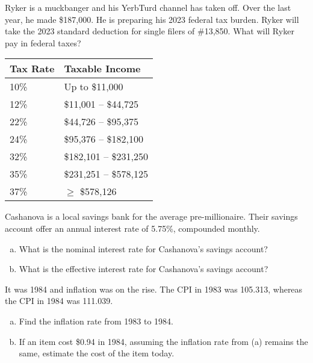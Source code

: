 \documentclass[12pt,letterpaper]{exam}
\begin{document}
\examtitle
{} 
\scores
\bottomline
\newpage

\begin{questions}

\newpage
\question[10] Ryker is a muckbanger and his YerbTurd channel has taken off. Over the last year, he made \$187,000. He is preparing his 2023 federal tax burden. Ryker will take the 2023 standard deduction for single filers of \#13,850. What will Ryker pay in federal taxes? 
	\begin{table}[H]
	\centering
	\begin{tabular}{|l|l|} \hline
	Tax Rate & Taxable Income \\ \hline \hline
	10\% & Up to \$11,000 \\ \hline
	12\% & \$11,001 -- \$44,725 \\ \hline
	22\% & \$44,726 -- \$95,375 \\ \hline
	24\% & \$95,376 -- \$182,100 \\ \hline
	32\% & \$182,101 -- \$231,250 \\ \hline
	35\% & \$231,251 -- \$578,125 \\ \hline
	37\% & $\geq$ \$578,126 \\ \hline
	\end{tabular}
	\end{table}



\newpage
\question[10] Cashanova is a local savings bank for the average pre-millionaire. Their savings account offer an annual interest rate of 5.75\%, compounded monthly. 
	\begin{enumerate}[(a)]
	\item What is the nominal interest rate for Cashanova's savings account?
	\item What is the effective interest rate for Cashanova's savings account?
	\end{enumerate}



\newpage
\question[10] It was 1984 and inflation was on the rise. The CPI in 1983 was 105.313, whereas the CPI in 1984 was 111.039. 
	\begin{enumerate}[(a)]
	\item Find the inflation rate from 1983 to 1984.
	\item If an item cost \$0.94 in 1984, assuming the inflation rate from (a) remains the same, estimate the cost of the item today. 
	\end{enumerate}
	

\end{questions}
\end{document}
